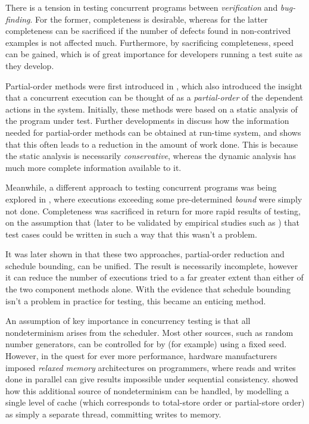 
There is a tension in testing concurrent programs between
\emph{verification} and \emph{bug-finding}. For the former,
completeness is desirable, whereas for the latter completeness can be
sacrificed if the number of defects found in non-contrived examples is
not affected much. Furthermore, by sacrificing completeness, speed can
be gained, which is of great importance for developers running a test
suite as they develop.


Partial-order methods were first introduced in \citep{por}, which also
introduced the insight that a concurrent execution can be thought of
as a \emph{partial-order} of the dependent actions in the
system. Initially, these methods were based on a static analysis of
the program under test. Further developments in \citep{dpor} discuss
how the information needed for partial-order methods can be obtained
at run-time system, and shows that this often leads to a reduction in
the amount of work done. This is because the static analysis is
necessarily \emph{conservative}, whereas the dynamic analysis has much
more complete information available to it.

Meanwhile, a different approach to testing concurrent programs was
being explored in \citep{pbound}, where executions exceeding some
pre-determined \emph{bound} were simply not done. Completeness was
sacrificed in return for more rapid results of testing, on the
assumption that (later to be validated by empirical studies such as
\citep{empirical}) that test cases could be written in such a way that
this wasn't a problem.

It was later shown in \citep{bpor} that these two approaches,
partial-order reduction and schedule bounding, can be unified. The
result is necessarily incomplete, however it can reduce the number of
executions tried to a far greater extent than either of the two
component methods alone. With the evidence that schedule bounding
isn't a problem in practice for testing, this became an enticing
method.

An assumption of key importance in concurrency testing is that all
nondeterminism arises from the scheduler. Most other sources, such as
random number generators, can be controlled for by (for example) using
a fixed seed. However, in the quest for ever more performance,
hardware manufacturers imposed \emph{relaxed memory} architectures on
programmers, where reads and writes done in parallel can give results
impossible under sequential consistency. \citep{rdpor} showed how this
additional source of nondeterminism can be handled, by modelling a
single level of cache (which corresponds to total-store order or
partial-store order) as simply a separate thread, committing writes to
memory.

